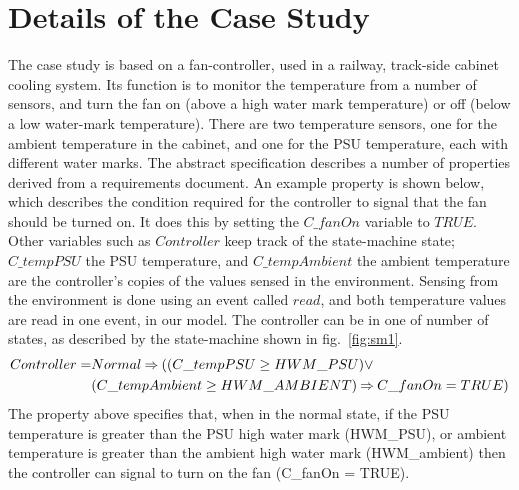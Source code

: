 \documentclass{llncs}%
\begin{document}
\section{Details of the Case Study}\label{CaseStudy}
The case study is based on a fan-controller, used in a railway, track-side cabinet cooling system. Its function is to monitor the temperature from a number of sensors, and turn the fan on (above a high water mark temperature) or off (below a low water-mark temperature). There are two temperature sensors, one for the ambient temperature in the cabinet, and one for the PSU temperature, each with different water marks. The abstract specification describes a number of properties derived from a requirements document. An example property is shown below, which describes the condition required for the controller to signal that the fan should be turned on. It does this by setting the $C\_fanOn$ variable to $TRUE$. Other variables such as $Controller$ keep track of the state-machine state; $C\_tempPSU$ the PSU temperature, and $C\_tempAmbient$  the ambient temperature are the controller's copies of the values sensed in the environment. Sensing from the environment is done using an event called $read$, and both temperature values are read in one event, in our model. The controller can be in one of number of states, as described by the state-machine shown in fig.~\ref{fig:sm1}. 
%
\begin{equation}
\begin{split}
Controller = &Normal \mathbin\Rightarrow ((C\_tempPSU \ge HWM\_PSU) \lor \\
& (C\_tempAmbient \ge HWM\_AMBIENT) \mathbin\Rightarrow C\_fanOn = TRUE)	
\end{split}
\notag
\end{equation}
%
The property above specifies that, when in the normal state, if the PSU temperature is greater than the PSU high water mark (HWM\_PSU), or ambient temperature is greater than the ambient high water mark (HWM\_ambient) then the controller can signal to turn on the fan (C\_fanOn = TRUE).
\end{document}
